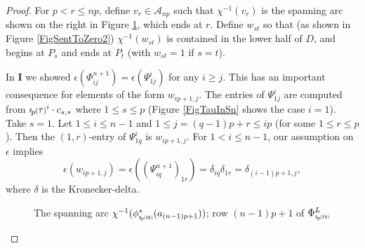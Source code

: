 \documentclass[11pt]{amsart}
\def\A{{\mathcal A}}
\newcommand*{\smallp}[1]{\scalebox{.75}{\ensuremath#1}}
\newcommand*{\subsmallp}[1]{\scalebox{.5}{\ensuremath#1}}
\newcommand{\pp}[2][p]{\imath_{\hspace*{-1pt}#1}\hspace*{-.5pt}\smallp(#2\smallp)}
\newcommand{\subpp}[2][p]{\imath_{\hspace*{-1pt}#1}\hspace*{-.5pt}\subsmallp(#2\subsmallp)}
\theoremstyle{definition}
\begin{document}
\begin{proof}
For $p< r \le np$, define $v_r\in\A_{np}$ such that $\chi^{-1}(v_r)$ is the spanning arc shown on the right in Figure \ref{FigPhiLCalcPhi}, which ends at $r$. Define $w_{st}$ so that (as shown in Figure \ref{FigSentToZero2}) $\chi^{-1}(w_{st})$ is contained in the lower half of $D$, and begins at $P_s$ and ends at $P_t$ (with $w_{st}=1$ if $s=t$).

In {\bf I} we showed $\epsilon(\Phi_{ij}^{n+1}) = \epsilon(\Psi_{1j}^i)$ for any $i\ge j$. This has an important consequence for elements of the form $w_{ip+1,j}$. The entries of $\Psi_{1j}^i$ are computed from $\pp\tau^i\cdot c_{s,\ast}$ where $1\le s\le p$ (Figure \ref{FigTauInSn} shows the case $i=1$). Take $s=1$. Let $1\le i\le n-1$ and $1\le j=(q-1)p+r\le ip$ (for some $1\le r\le p$). Then the $(1,r)$-entry of $\Psi_{1q}^i$ is $w_{ip+1,j}$. For $1<i\le n-1$, our assumption on $\epsilon$ implies
    \begin{equation}
    \epsilon(w_{ip+1,j})=\epsilon((\Psi_{iq}^{n+1})_{1r}) = \delta_{iq}\delta_{1r} = \delta_{(i-1)p+1,j},
    \label{EqnMod1Ws}
    \end{equation}
where $\delta$ is the Kronecker-delta. 

    \begin{figure}[ht]
      \caption{The spanning arc $\chi^{-1}(\phi^\ast_{\subpp\alpha}(a_{(n-1)p+1}))$; row $(n-1)p+1$ of $\Phi_{\subpp\alpha}^L$}
      \label{FigPhiLCalcPhi}
    \end{figure}


\end{proof}
\end{document}
